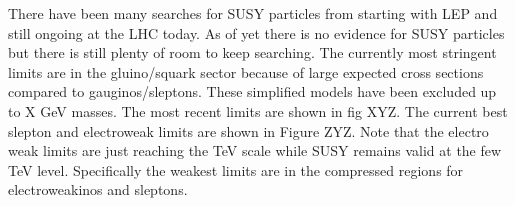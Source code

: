 There have been many searches for SUSY particles from starting with LEP and still ongoing at the LHC today. As of yet there is no evidence for SUSY particles but there is still plenty of room to keep searching. The currently most stringent limits are in the gluino/squark sector because of large expected cross sections compared to gauginos/sleptons. These simplified models have been excluded up to X GeV masses. The most recent limits are shown in fig XYZ.  The current best slepton and electroweak limits are shown in Figure ZYZ. Note that the electro weak limits are just reaching the TeV scale while SUSY remains valid at the few TeV level. Specifically the weakest limits are in the compressed regions for electroweakinos and sleptons. 



